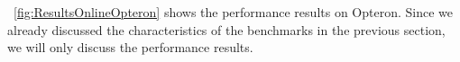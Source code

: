 \figurename~\ref{fig:ResultsOnlineOpteron} shows the performance results on Opteron. Since we already discussed the characteristics of the benchmarks in the previous section, we will only discuss the performance results.

\begin{figure}[!tb]
	\centering
\end{figure}
